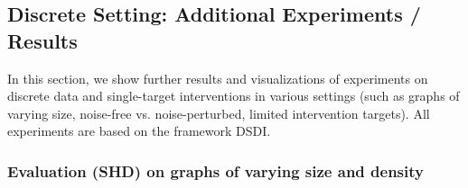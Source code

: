 \documentclass[nohyperref]{article}
\theoremstyle{plain}
\theoremstyle{definition}
\theoremstyle{remark}
\begin{document}
\subsection{Discrete Setting: Additional Experiments / Results}
In this section, we show further results and visualizations of experiments on discrete data and single-target interventions in various settings (such as graphs of varying size, noise-free vs. noise-perturbed, limited intervention targets). All experiments are based on the framework DSDI.

\subsubsection{Evaluation (SHD) on graphs of varying size and density}

\begin{table}[ht]
\vspace{-0.5\baselineskip}
    \centering
    \caption{SHD (lower is better) on various 5-variable synthetic datasets. Structured graphs are sorted in ascending order according to their edge density. \;\;$^{(*)}$ denotes average SHD over 10 random graphs., \; \textdagger ER-2 graphs on 5 results in the full5 graph and ER-4 graphs on 5 node graphs are non-existing 
    }
    \label{app_tab:shd_synthetic_5}
\end{table}
\end{document}
